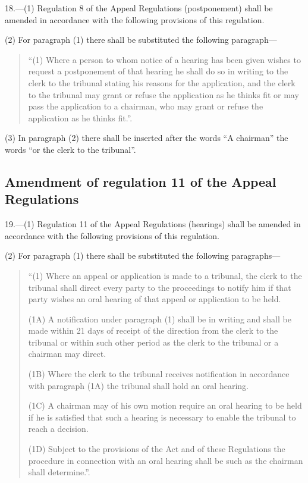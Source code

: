 \documentclass[a4paper]{article}
\begin{document}
18.—(1) Regulation 8 of the Appeal Regulations (postponement) shall be amended in accordance with the following provisions of this regulation.

(2) For paragraph (1) there shall be substituted the following paragraph—
\begin{quotation}
“(1) Where a person to whom notice of a hearing has been given wishes to request a postponement of that hearing he shall do so in writing to the clerk to the tribunal stating his reasons for the application, and the clerk to the tribunal may grant or refuse the application as he thinks fit or may pass the application to a chairman, who may grant or refuse the application as he thinks fit.”.
\end{quotation}

(3) In paragraph (2) there shall be inserted after the words “A chairman” the words “or the clerk to the tribunal”.

\subsection[19. Amendment of regulation 11 of the Appeal Regulations]{Amendment of regulation 11 of the Appeal Regulations}

19.—(1) Regulation 11 of the Appeal Regulations (hearings) shall be amended in accordance with the following provisions of this regulation.

(2) For paragraph (1) there shall be substituted the following paragraphs—
\begin{quotation}
“(1) Where an appeal or application is made to a tribunal, the clerk to the tribunal shall direct every party to the proceedings to notify him if that party wishes an oral hearing of that appeal or application to be held.

(1A) A notification under paragraph (1) shall be in writing and shall be made within 21 days of receipt of the direction from the clerk to the tribunal or within such other period as the clerk to the tribunal or a chairman may direct.

(1B) Where the clerk to the tribunal receives notification in accordance with paragraph (1A) the tribunal shall hold an oral hearing.

(1C) A chairman may of his own motion require an oral hearing to be held if he is satisfied that such a hearing is necessary to enable the tribunal to reach a decision.

(1D) Subject to the provisions of the Act and of these Regulations the procedure in connection with an oral hearing shall be such as the chairman shall determine.”.
\end{quotation}
\end{document}

